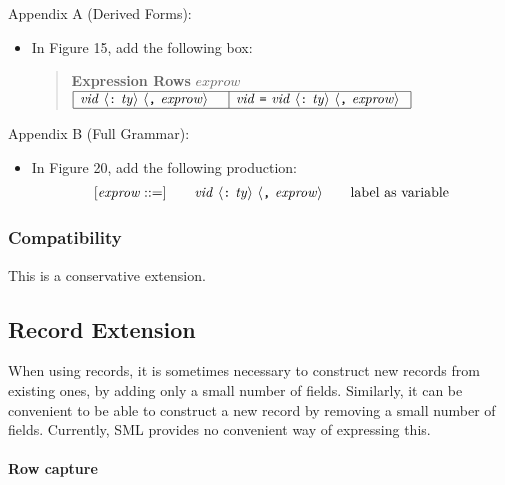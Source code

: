 \documentclass[twoside,titlepage]{article}
\begin{document}
\begin{appendix}
Appendix A (Derived Forms):
\begin{itemize}
\item In Figure 15, add the following box:
  \begin{quote}
  {\bf Expression Rows} $\mathit{exprow}$ \\
  $\begin{array}{|l|l|}
  \hline
  \mathit{vid}~\langle\mbox{\tt:}~\mathit{ty}\rangle~\langle\mbox{\tt,}~\mathit{exprow}\rangle~~~
  & \mathit{vid}~\mbox{\tt=}~\mathit{vid}~\langle\mbox{\tt:}~\mathit{ty}\rangle~\langle\mbox{\tt,}~\mathit{exprow}\rangle~ \\
  \hline
  \end{array}$
  \end{quote}
\end{itemize}

Appendix B (Full Grammar):
\begin{itemize}
\item In Figure 20, add the following production:
  $$
  \begin{array}{l@{\qquad}l@{\qquad}l}
   [\mathit{exprow} ::=] & \mathit{vid}~\langle\mbox{\tt:}~\mathit{ty}\rangle~\langle\mbox{\tt,}~\mathit{exprow}\rangle & \textrm{label as variable}
  \end{array}
  $$
\end{itemize}

\subsubsection*{Compatibility}

This is a conservative extension.


\subsection{Record Extension}
\label{ext-recordextension}

When using records, it is sometimes necessary to construct new records from existing ones, by adding only a small number of fields. Similarly, it can be convenient to be able to construct a new record by removing a small number of fields. Currently, SML provides no convenient way of expressing this.

\paragraph{Row capture}


\end{appendix}
\end{document}
